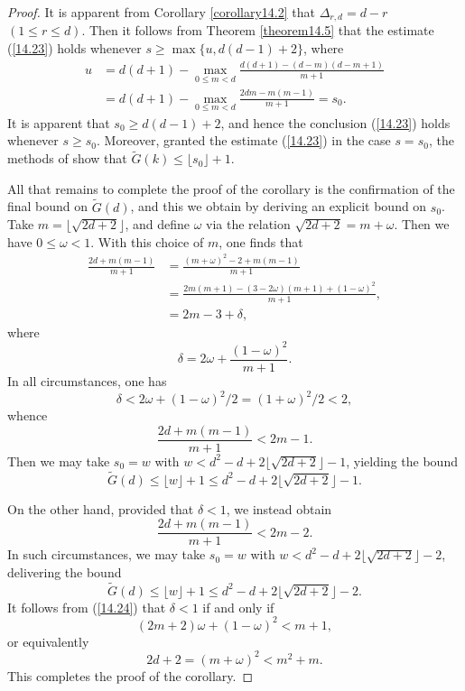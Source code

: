 \documentclass[12pt,reqno]{amsart}
\theoremstyle{definition}
\theoremstyle{remark}
\numberwithin{equation}{section}
\def\Gtil{\widetilde G}\def\Itil{\widetilde I}\def\Ktil{\widetilde K}
\def\del{{\delta}} \def\Del{{\Delta}} \def\Deltil{{\widetilde \Delta}}
\def\ome{{\omega}} \def\Ome{{\Omega}}
\def\le{\leqslant} \def\ge{\geqslant} \def\pleq{\preccurlyeq} \def\ple{\prec}
\begin{document}
\begin{proof} It is apparent from Corollary \ref{corollary14.2} that $\Del_{r,d}=d-r$ 
$(1\le r\le d)$. Then it follows from Theorem \ref{theorem14.5} that the estimate 
(\ref{14.23}) holds whenever $s\ge \max\{u,d(d-1)+2\}$, where
\begin{align*}
u&=d(d+1)-\max_{0\le m<d}\frac{d(d+1)-(d-m)(d-m+1)}{m+1}\\
&=d(d+1)-\max_{0\le m<d}\frac{2dm-m(m-1)}{m+1}=s_0.
\end{align*}
It is apparent that $s_0\ge d(d-1)+2$, and hence the conclusion (\ref{14.23}) holds 
whenever $s\ge s_0$. Moreover, granted the estimate (\ref{14.23}) in the case $s=s_0$, 
the methods of \cite[Chapter 4]{Vau1997} show that $\Gtil(k)\le \lfloor s_0\rfloor +1$.\par

All that remains to complete the proof of the corollary is the confirmation of the final bound 
on $\Gtil(d)$, and this we obtain by deriving an explicit bound on $s_0$. Take 
$m=\lfloor \sqrt{2d+2}\rfloor$, and define $\ome$ via the relation 
$\sqrt{2d+2}=m+\ome$. Then we have $0\le \ome<1$. With this choice of $m$, one finds 
that
\begin{align*}
\frac{2d+m(m-1)}{m+1}&=
\frac{(m+\ome)^2-2+m(m-1)}{m+1}\\
&=\frac{2m(m+1)-(3-2\ome )(m+1)+(1-\ome)^2}{m+1},\\
&=2m-3+\del,\end{align*}
where
\begin{equation}\label{14.24}
\del=2\ome+\frac{(1-\ome)^2}{m+1}.
\end{equation}
In all circumstances, one has
$$\del<2\ome+(1-\ome)^2/2=(1+\ome)^2/2<2,$$
whence
$$\frac{2d+m(m-1)}{m+1}<2m-1.$$
Then we may take $s_0=w$ with $w<d^2-d+2\lfloor \sqrt{2d+2}\rfloor-1$, yielding the 
bound
$$\Gtil(d)\le \lfloor w\rfloor +1\le d^2-d+2\lfloor \sqrt{2d+2}\rfloor -1.$$

\par On the other hand, provided that $\del<1$, we instead obtain
$$\frac{2d+m(m-1)}{m+1}<2m-2.$$
In such circumstances, we may take $s_0=w$ with 
$w<d^2-d+2\lfloor \sqrt{2d+2}\rfloor-2$, delivering the bound
$$\Gtil(d)\le \lfloor w\rfloor +1\le d^2-d+2\lfloor \sqrt{2d+2}\rfloor -2.$$
It follows from (\ref{14.24}) that $\del<1$ if and only if
$$(2m+2)\ome +(1-\ome)^2<m+1,$$
or equivalently
$$2d+2=(m+\ome)^2<m^2+m.$$
This completes the proof of the corollary.
\end{proof}
\end{document}
